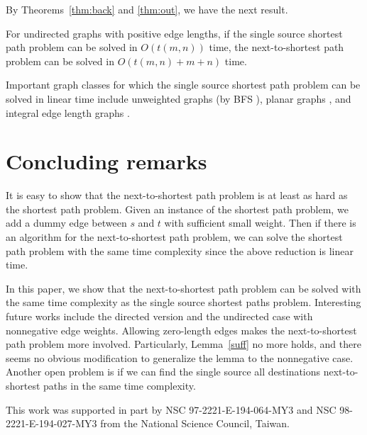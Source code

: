 By Theorems~\ref{thm:back} and \ref{thm:out}, we have the next result.
\begin{corollary}
For undirected graphs with positive edge lengths, if the single source shortest path problem can be solved in $O(t(m,n))$ time, the next-to-shortest path problem can be solved in $O(t(m,n)+m+n)$ time.
\end{corollary}
Important graph classes for which the single source shortest path problem can be solved in linear time include unweighted graphs (by BFS \cite{cor01}), planar graphs \cite{hen97}, and integral edge length graphs \cite{thr99}.

\section{Concluding remarks}

It is easy to show that the next-to-shortest path problem is at least as hard as the shortest path problem.
Given an instance of the shortest path problem, we add a dummy edge between $s$ and $t$ with sufficient small weight.
Then if there is an algorithm for the next-to-shortest path problem, we can solve the shortest path problem with the same time complexity since the above reduction is linear time.

In this paper, we show that the next-to-shortest path problem can be solved with the same time complexity as the single source shortest paths problem. 
Interesting future works include the directed version and the undirected case with nonnegative edge weights. 
Allowing zero-length edges makes the next-to-shortest path problem more involved. 
Particularly, Lemma~\ref{suff} no more holds, and there seems no obvious modification to generalize the lemma to the nonnegative case.  
Another open problem is if we can find the single source all destinations next-to-shortest paths in the same time complexity.


\begin{acknowledgements}
This work was supported in part by 
NSC 97-2221-E-194-064-MY3 and NSC 98-2221-E-194-027-MY3 from the National Science Council, Taiwan.
\end{acknowledgements}

